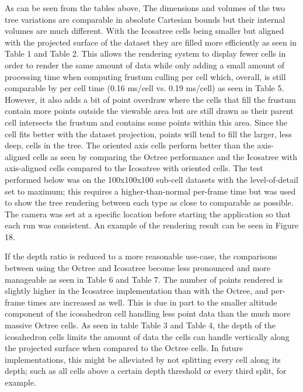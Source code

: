 

As can be seen from the tables above, The dimensions and volumes of the two tree variations are comparable in absolute Cartesian bounds but their internal volumes are much different. With the Icosatree cells being smaller but aligned with the projected surface of the dataset they are filled more efficiently as seen in Table 1 and Table 2. This allows the rendering system to display fewer cells in order to render the same amount of data while only adding a small amount of processing time when computing frustum culling per cell which, overall, is still comparable by per cell time (0.16 ms/cell vs. 0.19 ms/cell) as seen in Table 5. However, it also adds a bit of point overdraw where the cells that fill the frustum contain more points outside the viewable area but are still drawn as their parent cell intersects the frustum and contains some points within this area. Since the cell fits better with the dataset projection, points will tend to fill the larger, less deep, cells in the tree. The oriented axis cells perform better than the axis-aligned cells as seen by comparing the Octree performance and the Icosatree with axis-aligned cells compared to the Icosatree with oriented cells. The test performed below was on the 100x100x100 sub-cell datasets with the level-of-detail set to maximum; this requires a higher-than-normal per-frame time but was used to show the tree rendering between each type as close to comparable as possible. The camera was set at a specific location before starting the application so that each run was consistent. An example of the rendering result can be seen in Figure 18.



If the depth ratio is reduced to a more reasonable use-case, the comparisons between using the Octree and Icosatree become less pronounced and more manageable as seen in Table 6 and Table 7. The number of points rendered is slightly higher in the Icosatree implementation than with the Octree, and per-frame times are increased as well. This is due in part to the smaller altitude component of the icosahedron cell handling less point data than the much more massive Octree cells. As seen in table Table 3 and Table 4, the depth of the icosahedron cells limits the amount of data the cells can handle vertically along the projected surface when compared to the Octree cells. In future implementations, this might be alleviated by not splitting every cell along its depth; such as all cells above a certain depth threshold or every third split, for example.





























